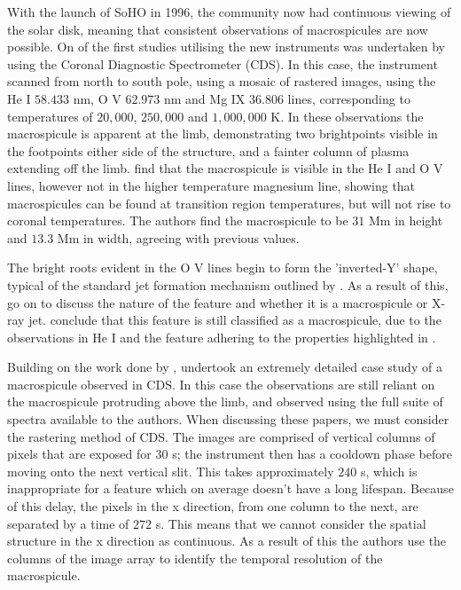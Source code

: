 With the launch of SoHO in 1996, the community now had continuous viewing of the solar disk, meaning that consistent observations of macrospicules are now possible.
On of the first studies utilising the new instruments was undertaken by \cite{Pike1997} using the Coronal Diagnostic Spectrometer (CDS).
In this case, the instrument scanned from north to south pole, using a mosaic of rastered images, using the He I $58.433$ nm, O V $62.973$ nm and Mg IX $36.806$ lines, corresponding to temperatures of $20,000$, $250,000$ and $1,000,000$ K.
In these observations the macrospicule is apparent at the limb, demonstrating two brightpoints visible in the footpoints either side of the structure, and a fainter column of plasma extending off the limb.
\cite{Pike1997} find that the macrospicule is visible in the He I and O V lines, however not in the higher temperature magnesium line, showing that macrospicules can be found at transition region temperatures, but will not rise to coronal temperatures.
The authors find the macrospicule to be $31$ Mm in height and $13.3$ Mm in width, agreeing with previous values.

The bright roots evident in the O V lines begin to form the 'inverted-Y' shape, typical of the standard jet formation mechanism outlined by \cite{Shibata1992}.
As a result of this, \cite{Pike1997} go on to discuss the nature of the feature and whether it is a macrospicule or X-ray jet.
\cite{Pike1997} conclude that this feature is still classified as a macrospicule, due to the observations in He I and the feature adhering to the properties highlighted in \cite{Bohlin1976}.

Building on the work done by \cite{Pike1997}, \cite{Parenti2002} undertook an extremely detailed case study of a macrospicule observed in CDS.
In this case the observations are still reliant on the macrospicule protruding above the limb, and observed using the full suite of spectra available to the authors.
When discussing these papers, we must consider the rastering method of CDS.
The images are comprised of vertical columns of pixels that are exposed for $30 $ s; the instrument then has a cooldown phase before moving onto the next vertical slit.
This takes approximately $240$ s, which is inappropriate for a feature which on average doesn't have a long lifespan.
Because of this delay, the pixels in the x direction, from one column to the next, are separated by a time of $272$ s.
This means that we cannot consider the spatial structure in the x direction as continuous.
As a result of this the authors use the columns of the image array to identify the temporal resolution of the macrospicule. 

